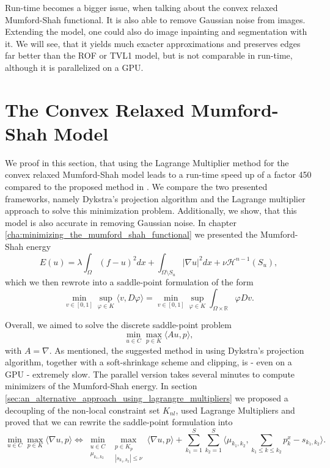 \documentclass{scrreprt}
\begin{document}
        Run-time becomes a bigger issue, when talking about the convex relaxed Mumford-Shah functional. It is also able to remove Gaussian noise from images. Extending the model, one could also do image inpainting and segmentation with it. We will see, that it yields much exacter approximations and preserves edges far better than the ROF or TVL1 model, but is not comparable in run-time, although it is parallelized on a GPU.


    \section{The Convex Relaxed Mumford-Shah Model} %
    \label{sec:the_convex_relaxed_mumford_shah_model}
        
        We proof in this section, that using the Lagrange Multiplier method for the convex relaxed Mumford-Shah model leads to a run-time speed up of a factor 450 compared to the proposed method in \cite{Pock-et-al-iccv09}.
        We compare the two presented frameworks, namely Dykstra's projection algorithm and the Lagrange multiplier approach to solve this minimization problem. Additionally, we show, that this model is also accurate in removing Gaussian noise. In chapter \ref{cha:minimizing_the_mumford_shah_functional} we presented the Mumford-Shah energy
            $$
                E(u) = \lambda \int_{\Omega} (f - u)^{2} dx + \int_{\Omega \setminus S_{u}} |\nabla u|^{2} dx + \nu \mathcal{H}^{n-1}(S_{u}),
            $$
        which we then rewrote into a saddle-point formulation of the form
            $$
                \min_{v \in [0, 1]} \sup_{\varphi \in K} \langle v, D\varphi \rangle = \min_{v \in [0, 1]} \sup_{\varphi \in K} \int_{\Omega \times \mathbb{R}} \varphi Dv.
            $$

        Overall, we aimed to solve the discrete saddle-point problem 
            $$
                \min_{u \in C} \max_{p \in K} \langle Au, p \rangle,
            $$
        with $A = \nabla$. As mentioned, the suggested method in \cite{Pock-et-al-iccv09} using Dykstra's projection algorithm, together with a soft-shrinkage scheme and clipping, is - even on a GPU - extremely slow. The parallel version takes several minutes to compute minimizers of the Mumford-Shah energy. In section \ref{sec:an_alternative_approach_using_lagrangre_multipliers} we proposed a decoupling of the non-local constraint set $K_{nl}$, used Lagrange Multipliers and proved that we can rewrite the saddle-point formulation into
            $$
                \min_{u \in C} \max_{p \in K} \langle \nabla u, p \rangle \Longleftrightarrow \min_{\substack{u \in C \\ \mu_{k_{1}, k_{2}}}} \max_{\substack{p \in K_{p} \\ |s_{k_{1}, k_{2}}| \le \nu}} \langle \nabla u, p \rangle + \sum_{k_{1} = 1}^{S} \sum_{k_{2} = 1}^{S} \langle \mu_{k_{1}, k_{2}}, \sum_{k_{1} \le k \le k_{2}} p^{x}_{k} - s_{k_{1}, k_{2}} \rangle.
            $$
\end{document}
